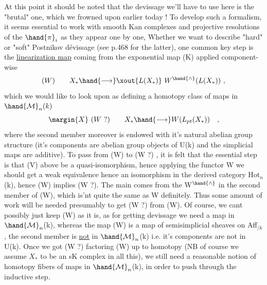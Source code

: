 
At this point it should be noted that the devissage we'll have to use
here is the "brutal" one,  which we frowned upon earlier today !  To
develop such a formalism,  it seems essential to work with smooth Kan
complexes and projective resolutions of the $\hand{\pi}_{i}$ as they appear one by one,
  Whether we want to describe "hard" or "soft" Postnikov
dévissage (see p.468 for the latter),  one common key step is the
\uline{linearization map}  coming from the exponential map (K)  applied component-%
wise
\[
(W) \qquad X_{\ast} \hand{\longrightarrow} \xout{L(X_{\ast})}\ W^{\hand{\wedge}}(L(X_{\ast})) \ ,
\]
which we would like to look upon as  defining a homotopy class of
maps in $\hand{\mathcal{M}}_n(k)$
\[
\margin{X}\ (W\ ?) \qquad X_{\ast} \hand{\longrightarrow} W(L_{pt}(X_{\ast})) \quad ,
\]
where the second member moreover is endowed with it's natural abelian
group structure (it's components are abelian group objects of U(k) and the
simplicial maps are additive).  To pass from (W) to (W ?) ,  it is felt
that the essential step is that (V) above be a quasi-isomorphism, hence\hand{,}
applying the functor W\hand{,} we should get a  weak equivalence\hand{,}
hence an isomorphism in the  derived category Hot$_n$(k),  hence
(W)  implies (W ?).  The  main  comes from the W$^{\hand{\wedge}}$ in the
second member of (W),  which is'nt quite the same as W definitely.  Thus
some amount of work will be needed presumably to get (W ?) from (W).
Of course,  we cant possibly just keep (W) as it is,  as for getting
devissage we need a map in $\hand{\mathcal{M}}_n$(k),  whereas the map (W) is a map of
semisimplicial sheaves on Aff$_{/k}$  ,  the second member is \uline{not} in
$\hand{\mathcal{M}}_n$(k)  i.e. it's components are not in U(k).  Once we got (W ?)
factoring (W) up to homotopy (NB of course we assume $X_{\ast}$ to be an sK
complex in all this),  we still need a reasonable notion of homotopy
fibers of maps in $\hand{\mathcal{M}}_n$(k),  in order to push through the inductive step.

